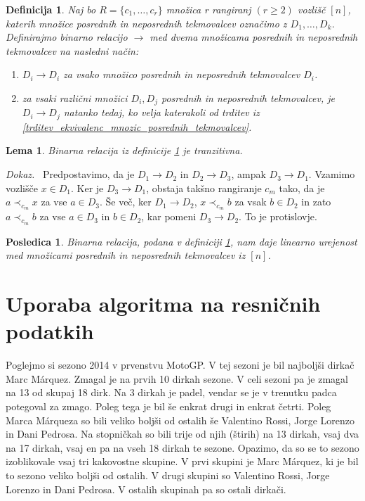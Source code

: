\documentclass[a4paper, 12pt]{book}
\newtheorem{definicija}{Definicija}[chapter]
\newtheorem{lema}{Lema}[chapter]
\newtheorem{posledica}{Posledica}[chapter]
\newenvironment{dokaz}{\emph{Dokaz.}\ }{\hspace{\fill}{$\Box$}}
\begin{document}
\begin{definicija}
\label{definicija_relacije_mnozic_posrednih_tekmovalcev}
    Naj bo $R = \{ c_1, \dots, c_r \}$ množica r rangiranj $(r \geq 2)$ vozlišč $[n]$, katerih množice posrednih in neposrednih tekmovalcev označimo z $D_1, \dots, D_k$. Definirajmo binarno relacijo $\rightarrow$ med dvema množicama posrednih in neposrednih tekmovalcev na nasledni način:
    \begin{enumerate}[label=(\roman*)]
        \item $D_i \rightarrow D_i$ za vsako množico posrednih in neposrednih tekmovalcev $D_i$.
        \item za vsaki različni množici $D_i, D_j$ posrednih in neposrednih tekmovalcev, je $D_i \rightarrow D_j$ natanko tedaj, ko velja katerakoli od trditev iz \ref{trditev_ekvivalenc_mnozic_posrednih_tekmovalcev}.
    \end{enumerate}
\end{definicija}

\begin{lema}
    Binarna relacija iz definicije \ref{definicija_relacije_mnozic_posrednih_tekmovalcev} je tranzitivna.
\end{lema}
\begin{dokaz}
    Predpostavimo, da je $D_1 \rightarrow D_2$ in $D_2 \rightarrow D_3$, ampak $D_3 \rightarrow D_1$. Vzamimo vozlišče $x \in D_1$. Ker je $D_3 \rightarrow D_1$, obstaja takšno rangiranje $c_m$ tako, da je $a \prec_{c_m} x$ za vse $a \in D_3$. Še več, ker $D_1 \rightarrow D_2$, $x \prec_{c_m} b$ za vsak $b \in D_2$ in zato $a \prec_{c_m} b$ za vse $a \in D_3$ in $b \in D_2$, kar pomeni $D_3 \rightarrow D_2$. To je protislovje.
\end{dokaz}

\begin{posledica}
    Binarna relacija, podana v definiciji \ref{definicija_relacije_mnozic_posrednih_tekmovalcev}, nam daje linearno urejenost med množicami posrednih in neposrednih tekmovalcev iz $[n]$.
\end{posledica}


\section{Uporaba algoritma na resničnih podatkih}

Poglejmo si sezono 2014 v prvenstvu MotoGP. V tej sezoni je bil najboljši dirkač Marc Márquez. Zmagal je na prvih 10 dirkah sezone. V celi sezoni pa je zmagal na 13 od skupaj 18 dirk. Na 3 dirkah je padel, vendar se je v trenutku padca potegoval za zmago. Poleg tega je bil še enkrat drugi in enkrat četrti. Poleg Marca Márqueza so bili veliko boljši od ostalih še Valentino Rossi, Jorge Lorenzo in Dani Pedrosa. Na stopničkah so bili trije od njih (štirih) na 13 dirkah, vsaj dva na 17 dirkah, vsaj en pa na vseh 18 dirkah te sezone. Opazimo, da so se to sezono izoblikovale vsaj tri kakovostne skupine. V prvi skupini je Marc Márquez, ki je bil to sezono veliko boljši od ostalih. V drugi skupini so Valentino Rossi, Jorge Lorenzo in Dani Pedrosa. V ostalih skupinah pa so ostali dirkači.
\end{document}
